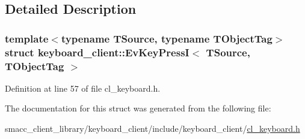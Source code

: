 \subsection{Detailed Description}
\subsubsection*{template$<$typename T\+Source, typename T\+Object\+Tag$>$\newline
struct keyboard\+\_\+client\+::\+Ev\+Key\+Press\+I$<$ T\+Source, T\+Object\+Tag $>$}



Definition at line 57 of file cl\+\_\+keyboard.\+h.



The documentation for this struct was generated from the following file\+:\begin{DoxyCompactItemize}
\item 
smacc\+\_\+client\+\_\+library/keyboard\+\_\+client/include/keyboard\+\_\+client/\hyperlink{cl__keyboard_8h}{cl\+\_\+keyboard.\+h}\end{DoxyCompactItemize}
